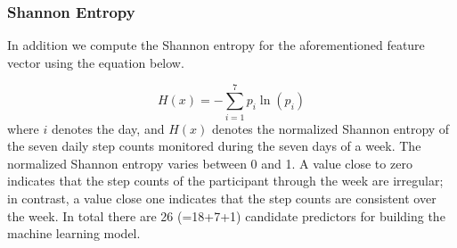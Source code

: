 \documentclass[preprint,12pt]{elsarticle}
\begin{document}
\subsubsection{Shannon Entropy}
In addition we compute the Shannon entropy \cite{shannon1948mathematical} for the aforementioned feature vector using the equation below.


\begin{equation}
   H(x) = -\sum_{i=1}^{7}p_{i}\ln(p_{i})
\end{equation}
where $i$ denotes the day, and $H(x)$ denotes the normalized Shannon entropy of the seven daily step counts monitored during the seven days of a week. The normalized Shannon entropy varies between 0 and 1. A value close to zero indicates that the step counts of the participant through the week are irregular; in contrast, a value close one indicates that the step counts are consistent over the week. In total there are 26 (=18+7+1) candidate predictors for building the machine learning model.  
\end{document}
